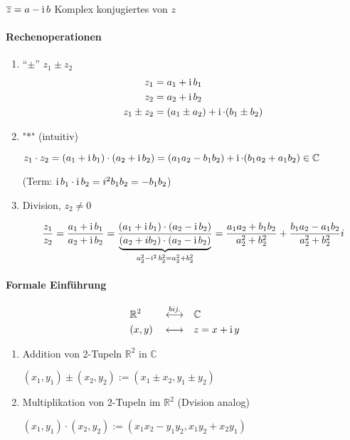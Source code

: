 \begin{definition}
 $\overline{z} = a - \operatorname{i} b$ Komplex konjugiertes von $z$
\end{definition}

\paragraph{Rechenoperationen}
\begin{enumerate}

\item ``$\pm$'' $z_1 \pm z_2$
\begin{align*}
z_1 & = a_1 + \operatorname{i} b_1 \\ 
z_2 & = a_2 + \operatorname{i} b_2 \\
z_1 \pm z_2 & = (a_1 \pm a_2) + \operatorname{i} \cdot (b_1 \pm b_2)
\end{align*}

\item "$\ast$" (intuitiv)

$z_1 \cdot z_2 = (a_1 + \operatorname{i} b_1) \cdot (a_2 + \operatorname{i} b_2) = (a_1 a_2 - b_1 b_2) + \operatorname{i} \cdot (b_1 a_2 + a_1 b_2) \in \mathbb{C}$

(Term: $\operatorname{i} b_1 \cdot \operatorname{i} b_2 = i^2 b_1 b_2 = - b_1 b_2$)

\item Division, $z_2 \neq 0$

$$ \frac{z_1}{z_2} = \frac{a_1 + \operatorname{i} b_1}{a_2 + \operatorname{i} b_2} = \frac{(a_1 + \operatorname{i} b_1) \cdot (a_2 - \operatorname{i} b_2)}{\underbrace{(a_2 + i b_2) \cdot (a_2 - \operatorname{i} b_2)}_{a_2^2 - \operatorname{i}^2 b_2^2 = a_2^2 + b_2^2}} = \frac{a_1 a_2 + b_1 b_2}{a_2^2 + b_2^2} + \frac{b_1 a_2 - a_1 b_2}{a_2^2 + b_2^2}i$$

\end{enumerate}

\paragraph{Formale Einführung}
\begin{alignat*}{3}
& \mathbb{R}^2 && \overset{bij.}{\longleftrightarrow} && \mathbb{C} \\
& (x, y) && \longleftrightarrow && z = x + \operatorname{i} y
\end{alignat*}
\begin{enumerate}
\item Addition von 2-Tupeln $\mathbb{R}^2$ in $\mathbb{C}$

$(x_1, y_1) \pm (x_2, y_2) := (x_1 \pm x_2, y_1 \pm y_2)$

\item Multiplikation von 2-Tupeln im $\mathbb{R}^2$ (Dvision analog)

$ (x_1, y_1) \cdot (x_2, y_2) := (x_1 x_2 - y_1 y_2, x_1 y_2 + x_2 y_1)$
\end{enumerate}

